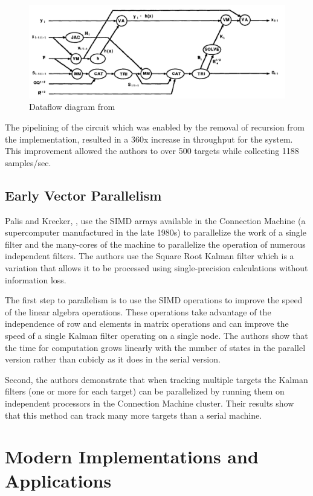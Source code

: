 \documentclass[11pt]{article}
\begin{document}
\begin{figure}
\includegraphics[width=\textwidth]{shaffer.png}
\caption{Dataflow diagram from \cite{Shaffer:1987:IPE:42040.42101}}
\label{fig:shaffer}
\end{figure}

The pipelining of the circuit which was enabled by the removal of recursion from the implementation, resulted in a 360x increase in throughput for the system. This improvement allowed the authors to over 500 targets while collecting 1188 samples/sec.

\subsection{Early Vector Parallelism}
Palis and Krecker, \cite{palis1990parallel}, use the SIMD arrays available in the Connection Machine (a supercomputer manufactured in the late 1980s) to parallelize the work of a single filter and the many-cores of the machine to parallelize the operation of numerous independent filters. The authors use the Square Root Kalman filter which is a variation that allows it to be processed using single-precision calculations without information loss.

The first step to parallelism is to use the SIMD operations to improve the speed of the linear algebra operations. These operations take advantage of the independence of row and elements in matrix operations and can improve the speed of a single Kalman filter operating on a single node. The authors show that the time for computation grows linearly with the number of states in the parallel version rather than cubicly as it does in the serial version. 

Second, the authors demonstrate that when tracking multiple targets the Kalman filters (one or more for each target) can be parallelized by running them on independent processors in the Connection Machine cluster. Their results show that this method can track many more targets than a serial machine.

\section{Modern Implementations and Applications}
\end{document}
